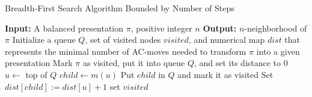 \begin{algorithm}
	\caption{Breadth-First Search Algorithm Bounded by Number of Steps}\label{alg:bfs_neigh}
	\begin{algorithmic}[1]
		\State \textbf{Input:} A balanced presentation $\pi$, positive integer $n$
		\State \textbf{Output:} $n$-neighborhood of $\pi$
		\State Initialize a queue $Q$, set of visited nodes $visited$, and numerical map $dist$ that represents the minimal number of AC-moves needed to transform $\pi$ into a given presentation
		\State Mark $\pi$ as visited, put it into queue $Q$, and set its distance to $0$
		\State $u \gets $ top of $Q$ 
		\State $child \gets m(u)$
		\State Put $child$ in $Q$ and mark it as visited
		\State Set $dist[child] := dist[u] + 1$
		\EndIf
		\EndFor
		\EndWhile
		\Return set $visited$
	\end{algorithmic}
\end{algorithm}